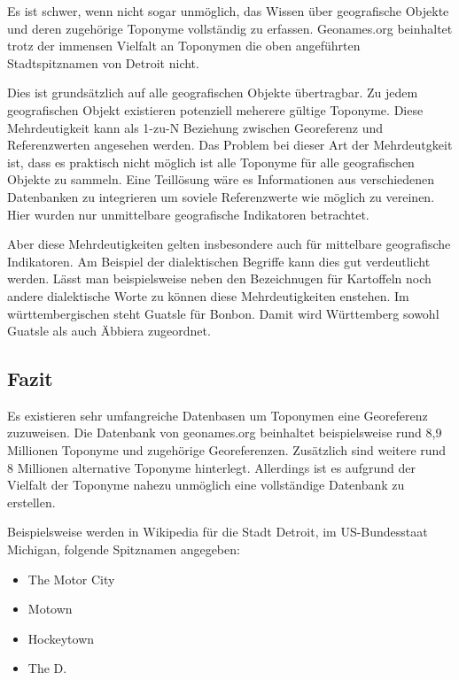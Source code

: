 							Es ist schwer, wenn nicht sogar unmöglich, das Wissen über geografische Objekte und deren zugehörige Toponyme vollständig zu erfassen.
							Geonames.org beinhaltet trotz der immensen Vielfalt an Toponymen die oben angeführten Stadtspitznamen von Detroit nicht.



							Dies ist grundsätzlich auf alle geografischen Objekte übertragbar.
							Zu jedem geografischen Objekt existieren potenziell meherere gültige Toponyme.
							Diese Mehrdeutigkeit kann als 1-zu-N Beziehung zwischen Georeferenz und Referenzwerten angesehen werden.
							Das Problem bei dieser Art der Mehrdeutgkeit ist, dass es praktisch nicht möglich ist alle Toponyme für alle geografischen Objekte zu sammeln. 
							Eine Teillösung wäre es Informationen aus verschiedenen Datenbanken zu integrieren um soviele Referenzwerte wie möglich zu vereinen.
							Hier wurden nur unmittelbare geografische Indikatoren betrachtet.

							Aber diese Mehrdeutigkeiten gelten insbesondere auch für mittelbare geografische Indikatoren.
							Am Beispiel der dialektischen Begriffe kann dies gut verdeutlicht werden.
							Lässt man beispielsweise neben den Bezeichnugen für Kartoffeln noch andere dialektische Worte zu können diese Mehrdeutigkeiten enstehen.
							Im württembergischen steht Guatsle für Bonbon. 
							Damit wird Württemberg sowohl Guatsle als auch Äbbiera zugeordnet.


				\subsection{Fazit}

					Es existieren sehr umfangreiche Datenbasen um Toponymen eine Georeferenz zuzuweisen. 
					Die Datenbank von geonames.org beinhaltet beispielsweise rund 8,9 Millionen Toponyme und zugehörige Georeferenzen.
					Zusätzlich sind weitere rund 8 Millionen alternative Toponyme hinterlegt.
					Allerdings ist es aufgrund der Vielfalt der Toponyme nahezu unmöglich eine vollständige Datenbank zu erstellen.

					Beispielsweise werden in Wikipedia für die Stadt Detroit, im US-Bundesstaat Michigan, folgende Spitznamen angegeben:
					\begin{itemize}
						\item The Motor City
						\item Motown
						\item Hockeytown
						\item The D. 
					\end{itemize}

